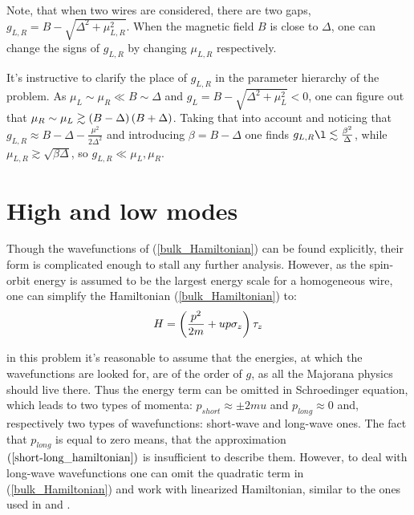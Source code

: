 Note, that when two wires are considered, there are two gaps, $ g_{L,R} = B-\sqrt{\Delta^2+\mu_{L,R}^2} $. When the magnetic field $ B $ is close to $ \Delta $, one can change the signs of $ g_{L,R} $ by changing $ \mu_{L,R} $ respectively. 

It's instructive to clarify the place of $ g_{L,R} $ in the parameter hierarchy of the problem. As $\mu_L \sim \mu_R \ll B\sim \Delta $  and $ g_L=B-\sqrt{\Delta^2+\mu_L^2}<0 $, one can figure out that $\mu_R\sim \mu_L \gtrsim \left(B-\Delta\right)\left(B+\Delta\right) $.  Taking that into account and noticing that $ g_{L,R} \approx B-\Delta -\frac{\mu^2}{2\Delta^2}$ and introducing $ \beta=B-\Delta $ one finds $ g_{L,R}\l\lesssim \frac{\beta^2}{\Delta} $, while $ \mu_{L,R} \gtrsim\sqrt{ \beta \Delta} $, so $ g_{L,R}\ll \mu_{L}, \mu_R $.

\section{High and low modes}
\label{sec:high_and_low_modes}

Though the wavefunctions of (\ref{bulk_Hamiltonian}) can be found explicitly, their form is  complicated enough to stall any further analysis. However, as the spin-orbit energy is assumed to be the largest energy scale for a homogeneous wire, one can simplify the Hamiltonian (\ref{bulk_Hamiltonian}) to:
\begin{gather}
\label{short-long_hamiltonian}
	H=\left(\frac{p^2}{2m}+up\sigma_z\right)\tau_z
\end{gather}

in this problem it's reasonable to assume that the energies, at which the wavefunctions are looked for, are of the order of $ g $, as all the Majorana physics should live there. Thus the energy term can be omitted in Schroedinger equation, which leads to two types of momenta: $ p_{short} \approx \pm 2mu$ and $ p_{long}\approx 0$ and, respectively two types of wavefunctions: short-wave and long-wave ones. The fact that $ p_{long} $ is equal to zero means, that the approximation $(\ref{short-long_hamiltonian})$ is insufficient to describe them. However, to deal with long-wave wavefunctions one can omit the quadratic term in (\ref{bulk_Hamiltonian}) and work with linearized Hamiltonian, similar to the ones used in \cite{Oreg_2010} and \cite{Lutchyn_2010}.